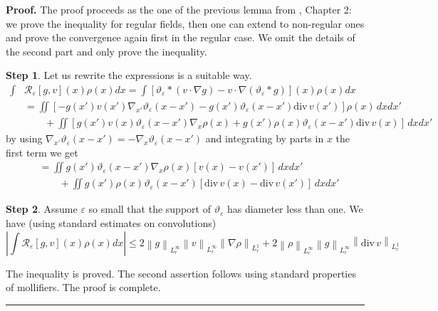 \documentclass[a4paper,10pt]{article}
\newenvironment{proof}[1][Proof]{\textbf{#1.} }{\ \rule{0.5em}{0.5em}}
\begin{document}
\begin{proof}
The proof proceeds as the one of the previous lemma from \cite{Lions}, Chapter
2: we prove the inequality for regular fields, then one can extend to
non-regular ones and prove the convergence again first in the regular case. We
omit the details of the second part and only prove the inequality.

\textbf{Step 1}. Let us rewrite the expressions is a suitable way.
\begin{equation*}
\begin{split}
\int & \mathcal{R}_{\varepsilon}\left[  g,v\right] (  x)  \rho(x) dx  = \int \left[
\vartheta_{\varepsilon}\ast\left(  v\cdot\nabla g\right)  -v\cdot\nabla\left(
\vartheta_{\varepsilon}\ast g\right)  \right] (  x) \rho(x) dx
\\
& = \iint [-g(x') v(x') \nabla_{x'} \vartheta_{\varepsilon}(x-x')
- g(x') \vartheta_{\varepsilon}(x-x') \mathrm{div}\,  v(x') ]
\rho(x) \, dx dx'
\\ & \qquad +
 \iint [g(x') v(x)  \vartheta_{\varepsilon}(x-x') \nabla_{x}\rho(x) + g(x')  \rho(x)  \vartheta_{\varepsilon}(x-x') \mathrm{div}\,  v(x) ] \, dx dx'
\end{split}
\end{equation*}
by using $\nabla_{x'} \vartheta_{\varepsilon}(x-x')  = -\nabla_{x}
\vartheta_{\varepsilon}(x-x') $ and integrating by parts in $x$
the first term we get
\begin{equation*}
\begin{split}
 & = \iint g(x')   \vartheta_{\varepsilon}(x-x')\nabla_{x}\rho(x)   [v(x)-v(x')]   \, dx dx'
\\ & \qquad +
 \iint g(x')  \rho(x)  \vartheta_{\varepsilon}(x-x')[ \mathrm{div}\,  v(x)-\mathrm{div}\,  v(x') ] \, dx dx'
\end{split}
\end{equation*}

\textbf{Step 2}. Assume $\varepsilon$ so small that the support of
$\vartheta_{\varepsilon}$ has diameter less than one. We have (using standard
estimates on convolutions)
\[
\left|\int  \mathcal{R}_{\varepsilon}\left[  g,v\right] (  x)  \rho(x) dx \right|
 \leq  2\left\|  g\right\|  _{L_{r}^{\infty}} \left\|
v\right\|  _{L_{r}^{\infty}}\left\|  \nabla\rho\right\|
_{L_{r}^{1}} + 2 \left\|  \rho\right\| _{L_{r}^{\infty}}\left\|
g\right\|  _{L_{r}^{\infty}}\left\| \mathrm{div}\,  v\right\|
_{L_{r}^{1}}
\]%

The inequality is proved. The second assertion follows using
standard properties of mollifiers.  The proof is complete.
\end{proof}
\end{document}

